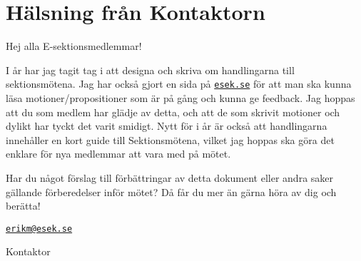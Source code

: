 \documentclass[../_main/handlingar.tex]{subfiles}
\begin{document}
\section{Hälsning från Kontaktorn}
Hej alla E-sektionsmedlemmar!

I år har jag tagit tag i att designa och skriva om handlingarna till sektionsmötena. Jag har också gjort en sida på \href{http://eee.esek.se}{\texttt{esek.se}} för att man ska kunna läsa motioner/propositioner som är på gång och kunna ge feedback. Jag hoppas att du som medlem har glädje av detta, och att de som skrivit motioner och dylikt har tyckt det varit smidigt. Nytt för i år är också att handlingarna innehåller en kort guide till Sektionsmötena, vilket jag hoppas ska göra det enklare för nya medlemmar att vara med på mötet.

Har du något förslag till förbättringar av detta dokument eller andra saker gällande förberedelser inför mötet? Då får du mer än gärna höra av dig och berätta!

\href{mailto:erikm@esek.se}{\texttt{erikm@esek.se}}

\begin{signatures}{1}
    \mvh
    \signature{\sekr}{Kontaktor}
\end{signatures}
\end{document}
